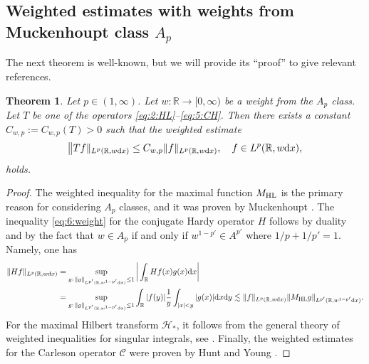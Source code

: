 \documentclass[11pt,oneside]{amsart}
\numberwithin{equation}{section}
\newtheorem{theorem}[equation]{Theorem}
\theoremstyle{definition}
\newcommand{\RR}{\mathbb{R}}
\newcommand{\calC}{\mathcal{C}}
\newcommand{\calH}{\mathcal{H}}
\begin{document}
\subsection{Weighted estimates with weights from Muckenhoupt class $A_p$}
The next theorem is well-known, but we will provide its ``proof'' to give relevant references.
\begin{theorem}\label{thm:weights}
Let $p\in(1,\infty)$. Let $w\colon\RR\to[0,\infty)$ be a weight from the $A_p$ class. Let $T$ be one of the operators \eqref{eq:2:HL}--\eqref{eq:5:CH}. Then there exists a constant $C_{w,p}:=C_{w,p}(T)>0$ such that the weighted estimate
\begin{equation}\label{eq:6:weight}
    \big\|Tf\|_{L^p(\RR,w{\rm d}x)}\leq C_{w,p}\|f\|_{L^p(\RR,w{\rm d}x)},\quad f\in L^p(\RR,w{\rm d}x),
\end{equation}
holds.
\end{theorem}
\begin{proof}
The weighted inequality for the maximal function $M_{\rm HL}$ is the primary reason for considering $A_p$ classes, and it was proven by Muckenhoupt \cite{Mu1}. The inequality \eqref{eq:6:weight} for the conjugate Hardy operator $H$ follows by duality and by the fact that $w\in A_p$ if and only if $w^{1-p'}\in A^{p'}$ where $1/p+1/p'=1$. Namely, one has
\begin{align*}
    \|Hf\|_{L^p(\RR,w{\rm d}x)}&=\sup_{g:\, \|g\|_{L^{p'}(\RR,w^{1-p'}{\rm d}x)}\leq1}\bigg|\int_{\RR}Hf(x)g(x){\rm d}x\bigg|\\
    &=\sup_{g:\, \|g\|_{L^{p'}(\RR,w^{1-p'}{\rm d}x)}\leq1}\int_{\RR}|f(y)|\frac{1}{y}\int_{|x|<y}|g(x)|{\rm d}x{\rm d}y
    \lesssim\|f\|_{L^p(\RR,w{\rm d}x)}\|M_{\rm HL}g\|_{L^{p'}(\RR,w^{1-p'}{\rm d}x)}.
\end{align*}
For the maximal Hilbert transform $\calH_\ast$, it follows from the general theory of weighted inequalities for singular integrals, see \cite[Chapter 9]{Graf2}. Finally, the weighted estimates for the Carleson operator $\calC$ were proven by Hunt and Young \cite{HuntYoung74}.
\end{proof}
\end{document}
